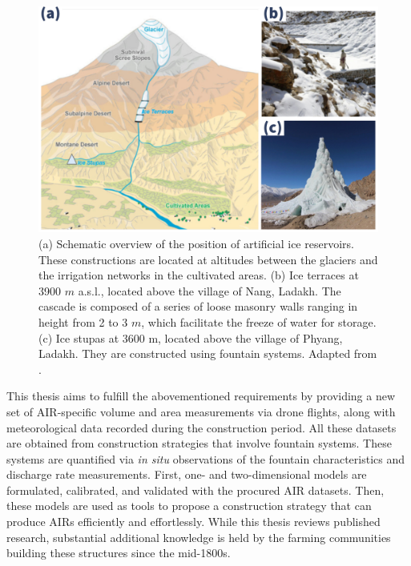 \begin{figure}[t]
	\centering
	\includegraphics[width=\textwidth]{figs/AIR_forms.jpg}

	\caption{ (a) Schematic overview of the position of artificial ice reservoirs. These constructions are located at
		altitudes between the glaciers and the irrigation networks in the cultivated areas. (b) Ice terraces at 3900
		$m$ \ac{a.s.l.}, located above the village of Nang, Ladakh. The cascade is composed of a series of loose masonry walls
		ranging in height from 2 to 3 $m$, which facilitate the freeze of water for storage. (c) Ice stupas at 3600 m, located
		above the village of Phyang, Ladakh. They are constructed using fountain systems. Adapted from \citet{nusserLocalKnowledgeGlobal2016}. }

	\label{fig:AIRforms}
\end{figure}

This thesis aims to fulfill the abovementioned requirements by providing a new set of AIR-specific volume and area
measurements via drone flights, along with meteorological data recorded during the construction period. All these
datasets are obtained from construction strategies that involve fountain systems. These systems are quantified
via \textit{in situ} observations of the fountain characteristics and discharge rate measurements. First, one- and two-dimensional models are formulated, calibrated, and validated with the procured AIR datasets. Then,
these models are used as tools to propose a construction strategy that can produce \ac{AIRs} efficiently and
effortlessly. While this thesis reviews published research, substantial additional knowledge is held by the
farming communities building these structures since the mid-1800s.


